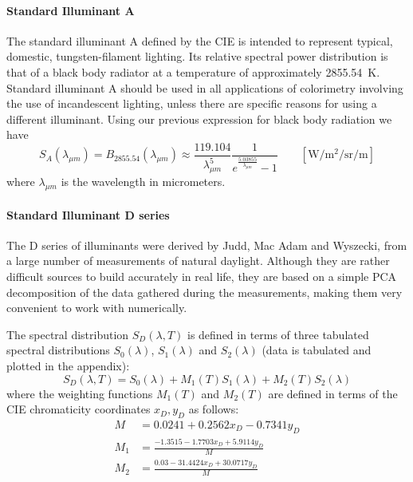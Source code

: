 \paragraph{Standard Illuminant A}

The standard illuminant A defined by the \gls{CIE} is intended to
represent typical, domestic, tungsten-filament lighting.
Its relative spectral power distribution is that of a black body radiator at a
temperature of approximately \SI{2855.54}{\kelvin}.
Standard illuminant A should be used in all applications of colorimetry
involving the use of incandescent lighting, unless there are specific reasons
for
using a different illuminant. Using our previous expression for black body radiation we have
\begin{equation}
S_{A}(\lambda_{\mu m}) = B_{2855.54}(\lambda_{\mu m}) \approx
\frac{119.104}{\lambda_{\mu m}^5} \frac 1{e^{\frac{5.03855}{\lambda_{\mu m}}}-1}
\qquad \left[\si{\watt\per\square\meter\per\steradian\per\meter}\right]
\end{equation}
where $\lambda_{\mu m}$ is the wavelength in micrometers.

\paragraph{Standard Illuminant D series}

The D series of illuminants were derived by Judd, Mac Adam and Wyszecki, from a
large number of measurements of natural daylight. Although they are rather
difficult sources to build accurately in real life, they are based on a simple
PCA decomposition of the data gathered during the measurements, making them
very convenient to work with numerically.

The spectral distribution $S_D(\lambda, T)$ is defined in terms of three tabulated spectral
distributions $S_0(\lambda)$, $S_1(\lambda)$ and $S_2(\lambda)$ (data is tabulated
and plotted in the appendix):
\begin{equation}
S_D(\lambda, T) = S_0(\lambda) + M_1(T) S_1(\lambda) + M_2(T) S_2(\lambda)
\end{equation}
where the weighting functions $M_1(T)$ and $M_2(T)$ are defined in terms of the
\gls{CIE} chromaticity coordinates $x_D, y_D$ as follows:
\begin{align*}
M   &= 0.0241 + 0.2562 x_D - 0.7341 y_D \\
M_1 &= \frac{-1.3515 - 1.7703 x_D + 5.9114 y_D}{M} \\
M_2 &= \frac{0.03 - 31.4424 x_D + 30.0717 y_D}{M} \\
\end{align*}


